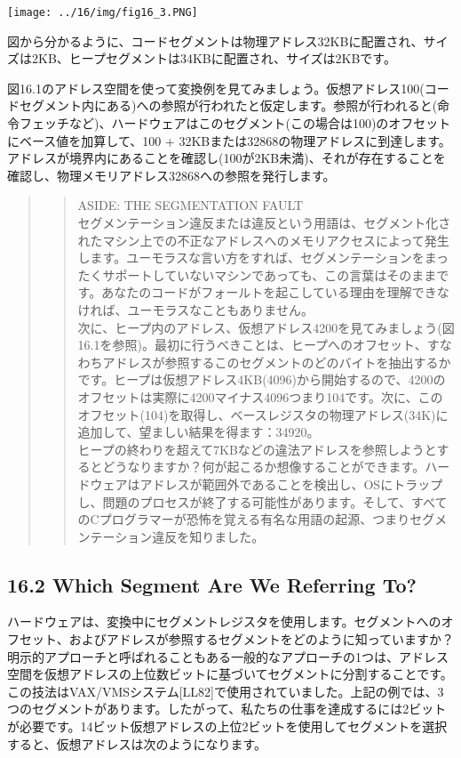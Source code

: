 \texttt{[image: ../16/img/fig16\_3.PNG]}

図から分かるように、コードセグメントは物理アドレス32KBに配置され、サイズは2KB、ヒープセグメントは34KBに配置され、サイズは2KBです。

図16.1のアドレス空間を使って変換例を見てみましょう。仮想アドレス100(コードセグメント内にある)への参照が行われたと仮定します。参照が行われると(命令フェッチなど)、ハードウェアはこのセグメント(この場合は100)のオフセットにベース値を加算して、100
+
32KBまたは32868の物理アドレスに到達します。アドレスが境界内にあることを確認し(100が2KB未満)、それが存在することを確認し、物理メモリアドレス32868への参照を発行します。

\begin{quote}
\begin{quote}
ASIDE: THE SEGMENTATION FAULT\\
セグメンテーション違反または違反という用語は、セグメント化されたマシン上での不正なアドレスへのメモリアクセスによって発生します。ユーモラスな言い方をすれば、セグメンテーションをまったくサポートしていないマシンであっても、この言葉はそのままです。あなたのコードがフォールトを起こしている理由を理解できなければ、ユーモラスなこともありません。\\
次に、ヒープ内のアドレス、仮想アドレス4200を見てみましょう(図16.1を参照)。最初に行うべきことは、ヒープへのオフセット、すなわちアドレスが参照するこのセグメントのどのバイトを抽出するかです。ヒープは仮想アドレス4KB(4096)から開始するので、4200のオフセットは実際に4200マイナス4096つまり104です。次に、このオフセット(104)を取得し、ベースレジスタの物理アドレス(34K)に追加して、望ましい結果を得ます：34920。\\
ヒープの終わりを超えて7KBなどの違法アドレスを参照しようとするとどうなりますか？何が起こるか想像することができます。ハードウェアはアドレスが範囲外であることを検出し、OSにトラップし、問題のプロセスが終了する可能性があります。そして、すべてのCプログラマーが恐怖を覚える有名な用語の起源、つまりセグメンテーション違反を知りました。
\end{quote}
\end{quote}

\hypertarget{which-segment-are-we-referring-to}{%
\subsection*{16.2 Which Segment Are We Referring
To?}\label{which-segment-are-we-referring-to}}

ハードウェアは、変換中にセグメントレジスタを使用します。セグメントへのオフセット、およびアドレスが参照するセグメントをどのように知っていますか？明示的アプローチと呼ばれることもある一般的なアプローチの1つは、アドレス空間を仮想アドレスの上位数ビットに基づいてセグメントに分割することです。この技法はVAX/VMSシステム{[}LL82{]}で使用されていました。上記の例では、3つのセグメントがあります。したがって、私たちの仕事を達成するには2ビットが必要です。14ビット仮想アドレスの上位2ビットを使用してセグメントを選択すると、仮想アドレスは次のようになります。

